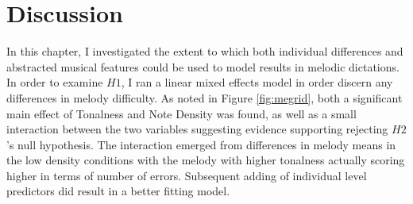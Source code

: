 \documentclass[12pt,]{book}
\begin{document}
\begin{table}[t]

\caption{\label{tab:modeltable}Linear Mixed Effects Model Fits}
\centering
{}
\end{table}

\hypertarget{discussion-2}{%
\section{Discussion}\label{discussion-2}}

In this chapter, I investigated the extent to which both individual differences and abstracted musical features could be used to model results in melodic dictations.
In order to examine \(H1\), I ran a linear mixed effects model in order discern any differences in melody difficulty.
As noted in Figure \ref{fig:megrid}, both a significant main effect of Tonalness and Note Density was found, as well as a small interaction between the two variables suggesting evidence supporting rejecting \(H2\)'s null hypothesis.
The interaction emerged from differences in melody means in the low density conditions with the melody with higher tonalness actually scoring higher in terms of number of errors.
Subsequent adding of individual level predictors did result in a better fitting model.
\end{document}
